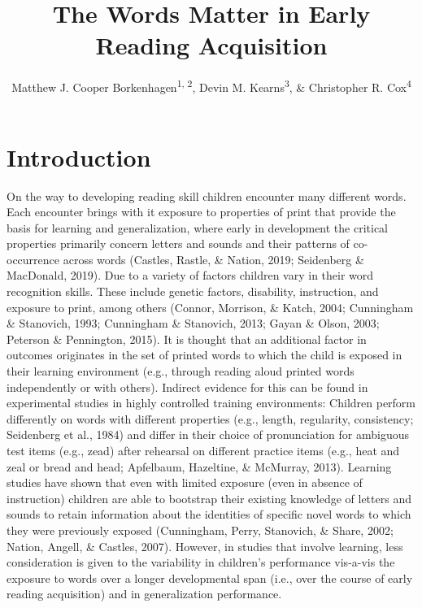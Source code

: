 \documentclass[
  ,man,floatsintext]{apa6}
\title{The Words Matter in Early Reading Acquisition}
\author{Matthew J. Cooper Borkenhagen\textsuperscript{1, 2}, Devin M. Kearns\textsuperscript{3}, \& Christopher R. Cox\textsuperscript{4}}
\date{}
\affiliation{\vspace{0.5cm}\textsuperscript{1} Florida State University\\\textsuperscript{2} The Florida Center for Reading Research\\\textsuperscript{3} North Carolina State University\\\textsuperscript{4} Louisiana State University}
\begin{document}
\maketitle

\section{Introduction}\label{introduction}

On the way to developing reading skill children encounter many different words. Each encounter brings with it exposure to properties of print that provide the basis for learning and generalization, where early in development the critical properties primarily concern letters and sounds and their patterns of co-occurrence across words (Castles, Rastle, \& Nation, 2019; Seidenberg \& MacDonald, 2019). Due to a variety of factors children vary in their word recognition skills. These include genetic factors, disability, instruction, and exposure to print, among others (Connor, Morrison, \& Katch, 2004; Cunningham \& Stanovich, 1993; Cunningham \& Stanovich, 2013; Gayan \& Olson, 2003; Peterson \& Pennington, 2015). It is thought that an additional factor in outcomes originates in the set of printed words to which the child is exposed in their learning environment (e.g., through reading aloud printed words independently or with others). Indirect evidence for this can be found in experimental studies in highly controlled training environments: Children perform differently on words with different properties (e.g., length, regularity, consistency; Seidenberg et al., 1984) and differ in their choice of pronunciation for ambiguous test items (e.g., zead) after rehearsal on different practice items (e.g., heat and zeal or bread and head; Apfelbaum, Hazeltine, \& McMurray, 2013). Learning studies have shown that even with limited exposure (even in absence of instruction) children are able to bootstrap their existing knowledge of letters and sounds to retain information about the identities of specific novel words to which they were previously exposed (Cunningham, Perry, Stanovich, \& Share, 2002; Nation, Angell, \& Castles, 2007). However, in studies that involve learning, less consideration is given to the variability in children's performance vis-a-vis the exposure to words over a longer developmental span (i.e., over the course of early reading acquisition) and in generalization performance.
\end{document}
